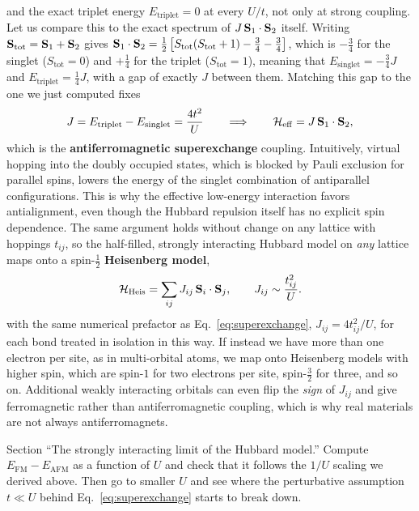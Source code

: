 \documentclass[lecture_notes.tex]{subfiles}
\begin{document}
and the exact triplet energy $E_{\mathrm{triplet}}=0$ at every $U/t$, not only at strong
coupling. Let us compare this to the exact spectrum of $J\,\vb S_1\cdot\vb S_2$ itself. Writing
$\vb S_{\mathrm{tot}}=\vb S_1+\vb S_2$ gives $\vb S_1\cdot\vb S_2 =
\tfrac12\left[S_{\mathrm{tot}}(S_{\mathrm{tot}}+1)-\tfrac34-\tfrac34\right]$, which is
$-\tfrac34$ for the singlet ($S_{\mathrm{tot}}=0$) and $+\tfrac14$ for the triplet
($S_{\mathrm{tot}}=1$), meaning that $E_{\mathrm{singlet}}=-\tfrac34J$ and
$E_{\mathrm{triplet}}=\tfrac14J$, with a gap of exactly $J$ between them. Matching this gap to the
one we just computed fixes
\begin{equation}
  J = E_{\mathrm{triplet}}-E_{\mathrm{singlet}} = \frac{4t^2}{U} \qquad\Longrightarrow\qquad
  \mathcal{H}_{\mathrm{eff}} = J\, \vb S_1\cdot\vb S_2,
  \label{eq:superexchange}
\end{equation}
which is the \textbf{antiferromagnetic superexchange} coupling. Intuitively, virtual hopping into
the doubly occupied states, which is blocked by Pauli exclusion for parallel spins, lowers the
energy of the singlet combination of antiparallel configurations. This is why the effective
low-energy interaction favors antialignment, even though the Hubbard repulsion itself has no
explicit spin dependence. The same argument holds without change on any lattice with hoppings
$t_{ij}$, so the half-filled, strongly interacting Hubbard model on \emph{any} lattice maps onto
a spin-$\tfrac12$ \textbf{Heisenberg model},
\begin{equation}
  \mathcal{H}_{\mathrm{Heis}} = \sum_{ij} J_{ij}\, \vb S_i \cdot \vb S_j, \qquad J_{ij} \sim
  \frac{t_{ij}^2}{U}.
  \label{eq:heislattice}
\end{equation}
with the same numerical prefactor as Eq.~\eqref{eq:superexchange}, $J_{ij}=4t_{ij}^2/U$, for each
bond treated in isolation in this way.
If instead we have more than one electron per site, as in multi-orbital atoms, we map onto
Heisenberg models with higher spin, which are spin-$1$ for two electrons per site,
spin-$\tfrac32$ for three, and so on. Additional weakly interacting orbitals can even flip the
\emph{sign} of $J_{ij}$ and give ferromagnetic rather than antiferromagnetic coupling, which is
why real materials are not always antiferromagnets.

\begin{notebook}
Section ``The strongly interacting limit of the Hubbard model.'' Compute $E_{\mathrm{FM}} -
E_{\mathrm{AFM}}$ as a function of $U$ and check that it follows the $1/U$ scaling we derived
above. Then go to smaller $U$ and see where the perturbative assumption $t\ll U$ behind
Eq.~\eqref{eq:superexchange} starts to break down.
\end{notebook}
\end{document}
